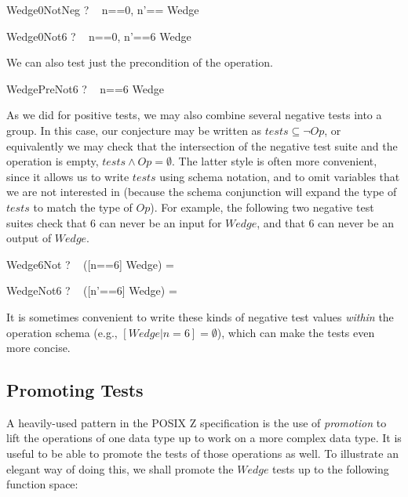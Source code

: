 \documentclass{llncs}
\begin{document}
\begin{theorem}{Wedge0NotNeg}
  \vdash? ~ \lblot n==0, n'== \rblot \notin Wedge
\end{theorem}
\vspace{-5ex}
\begin{theorem}{Wedge0Not6}
  \vdash? ~ \lblot n==0, n'==6 \rblot \in \lnot Wedge
\end{theorem}

We can also test just the precondition of the operation.
\begin{theorem}{WedgePreNot6}
  \vdash? ~ \lblot n==6 \rblot \notin \pre Wedge
\end{theorem}

As we did for positive tests, we may also combine several negative tests
into a group.  In this case, our conjecture may be written as $tests
\subseteq \lnot Op$, or equivalently we may check that the intersection of
the negative test suite and the operation is empty, $tests \land Op =
\emptyset$.  The latter style is often more convenient, since it allows us
to write $tests$ using schema notation, and to omit variables that we are
not interested in (because the schema conjunction will expand the type of
$tests$ to match the type of $Op$).  For example, the following two negative
test suites check that 6 can never be an input for $Wedge$, and that 6 can
never be an output of $Wedge$.

\begin{theorem}{Wedge6Not}
  \vdash? ~ ([n==6] \land Wedge) = \emptyset
\end{theorem}
\vspace{-5ex}
\begin{theorem}{WedgeNot6}
  \vdash? ~ ([n'==6] \land Wedge) = \emptyset
\end{theorem}

It is sometimes convenient to write these kinds of negative test values
\emph{within} the operation schema (e.g., $[Wedge | n=6] = \emptyset$),
which can make the tests even more concise.


\subsection{Promoting Tests}

A heavily-used pattern in the POSIX Z specification is the use of
\emph{promotion} to lift the operations of one data type up to work on a
more complex data type.  It is useful to be able to promote the tests
of those operations as well.  To illustrate an elegant way of doing this,
we shall promote the $Wedge$ tests up to the following function space:
\end{document}
